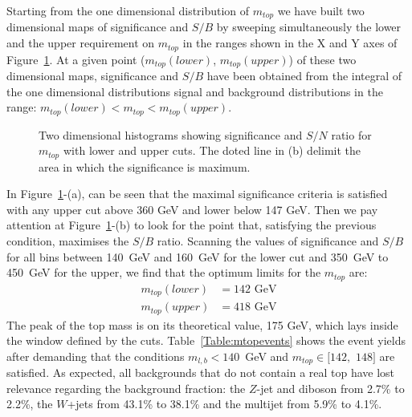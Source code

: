 Starting from the one dimensional distribution of $m_{top}$ we have built two dimensional maps of significance and $S/B$ by sweeping simultaneously the lower and the upper requirement on $m_{top}$ in the ranges shown in the X and Y axes of Figure~\ref{Fig:m(top)3D}. At a given point ($m_{top}(lower)$, $m_{top}(upper)$) of these two dimensional maps, significance and $S/B$ have been obtained from the integral of the one dimensional distributions signal and background distributions in the range: $m_{top}(lower) < m_{top} < m_{top}(upper)$.

\begin{figure}[h]
\centering
{}
\caption{Two dimensional histograms showing significance and $S/N$ ratio for $m_{top}$ with lower and upper cuts. The doted line in (b) delimit the area in which the significance is maximum.}
\label{Fig:m(top)3D}
\end{figure}

In Figure~\ref{Fig:m(top)3D}-(a), can be seen that the maximal significance criteria is satisfied with any upper cut above 360 GeV and lower below 147 GeV. Then we pay attention at Figure~\ref{Fig:m(top)3D}-(b) to look for the point that, satisfying the previous condition, maximises the $S/B$ ratio. Scanning the values of significance and $S/B$ for all bins between 140~GeV and 160~GeV for the lower cut and 350~GeV to 450~GeV for the upper, we find that the optimum limits for the $m_{top}$ are:
\begin{align*}
m_{top}(lower) &= 142 \textrm{ GeV}\\
m_{top}(upper) &= 418 \textrm{ GeV}
\end{align*}
The peak of the top mass is on its theoretical value, 175 GeV, which lays inside the window defined by the cuts. Table~\ref{Table:mtopevents} shows the event yields after demanding that the conditions $m_{l,b}<140$~GeV and $m_{top} \in [142,$ $148]$ are satisfied. As expected, all backgrounds that do not contain a real top have lost relevance regarding the background fraction: the $Z$-jet and diboson from 2.7\% to 2.2\%, the $W$+jets from 43.1\% to 38.1\% and the multijet from 5.9\% to 4.1\%.

